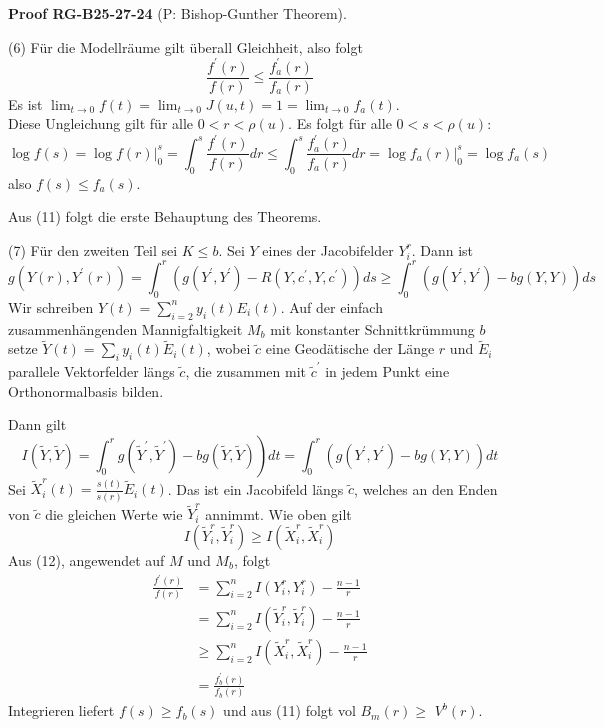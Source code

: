 \documentclass[10pt, letterpaper]{article}
\newcommand{\CustomHeading}[3]{%
  \par\medskip\noindent%
  \textbf{#1 #2} \textnormal{(#3)}.\enskip%
}
\newenvironment{PROOF}[2]{\begin{unitbox}\CustomHeading{Proof}{#1}{#2}}{\end{unitbox}}
\begin{document}
\begin{PROOF}{RG-B25-27-24}{P: Bishop-Gunther Theorem}
(6) Für die Modellräume gilt überall Gleichheit, also folgt
$$
\frac{f^{\prime}(r)}{f(r)} \leq \frac{f_{a}^{\prime}(r)}{f_{a}(r)}
$$
Es ist $\lim _{t \rightarrow 0} f(t)=\lim _{t \rightarrow 0} J(u, t)=1=\lim _{t \rightarrow 0} f_{a}(t)$.\\
Diese Ungleichung gilt für alle $0<r<\rho(u)$. Es folgt für alle $0<s<\rho(u)$:
$$\log f(s)=\left.\log f(r)\right|_{0} ^{s}=\int_{0}^{s} \frac{f^{\prime}(r)}{f(r)} d r \leq \int_{0}^{s} \frac{f_{a}^{\prime}(r)}{f_{a}(r)} d r=\left.\log f_{a}(r)\right|_{0} ^{s}=\log f_{a}(s)$$ 
also $f(s) \leq f_{a}(s)$.

Aus (11) folgt die erste Behauptung des Theorems.

(7) Für den zweiten Teil sei $K \leq b$. Sei $Y$ eines der Jacobifelder $Y_{i}^{r}$. Dann ist
$$g\left(Y(r), Y^{\prime}(r)\right)=\int_{0}^{r}\left(g\left(Y^{\prime}, Y^{\prime}\right)-R\left(Y, c^{\prime}, Y, c^{\prime}\right)\right) d s \geq \int_{0}^{r}\left(g\left(Y^{\prime}, Y^{\prime}\right)-b g(Y, Y)\right) d s$$
Wir schreiben $Y(t)=\sum_{i=2}^{n} y_{i}(t) E_{i}(t)$. Auf der einfach zusammenhängenden Mannigfaltigkeit $M_{b}$ mit konstanter Schnittkrümmung $b$ setze $\tilde{Y}(t)=\sum_{i} y_{i}(t) \tilde{E}_{i}(t)$, wobei $\tilde{c}$ eine Geodätische der Länge $r$ und $\tilde{E}_{i}$ parallele Vektorfelder längs $\tilde{c}$, die zusammen mit $\tilde{c}^{\prime}$ in jedem Punkt eine Orthonormalbasis bilden.

Dann gilt
$$
\left.I(\tilde{Y}, \tilde{Y})=\int_{0}^{r} g\left(\tilde{Y}^{\prime}, \tilde{Y}^{\prime}\right)-b g(\tilde{Y}, \tilde{Y})\right) d t=\int_{0}^{r}\left(g\left(Y^{\prime}, Y^{\prime}\right)-b g(Y, Y)\right) d t
$$
Sei $\tilde{X}_{i}^{r}(t)=\frac{s(t)}{s(r)} \tilde{E}_{i}(t)$. Das ist ein Jacobifeld längs $\tilde{c}$, welches an den Enden von $\tilde{c}$ die gleichen Werte wie $\tilde{Y}_{i}^{r}$ annimmt. Wie oben gilt
$$
I\left(\tilde{Y}_{i}^{r}, \tilde{Y}_{i}^{r}\right) \geq I\left(\tilde{X}_{i}^{r}, \tilde{X}_{i}^{r}\right)
$$
Aus (12), angewendet auf $M$ und $M_{b}$, folgt
$$
\begin{aligned}
\frac{f^{\prime}(r)}{f(r)} & =\sum_{i=2}^{n} I\left(Y_{i}^{r}, Y_{i}^{r}\right)-\frac{n-1}{r} \\
& =\sum_{i=2}^{n} I\left(\tilde{Y}_{i}^{r}, \tilde{Y}_{i}^{r}\right)-\frac{n-1}{r} \\
& \geq \sum_{i=2}^{n} I\left(\tilde{X}_{i}^{r}, \tilde{X}_{i}^{r}\right)-\frac{n-1}{r} \\
& =\frac{f_{b}^{\prime}(r)}{f_{b}(r)}
\end{aligned}
$$
Integrieren liefert $f(s) \geq f_{b}(s)$ und aus (11) folgt vol $B_{m}(r) \geq$ $V^{b}(r)$.
\end{PROOF}
\end{document}
